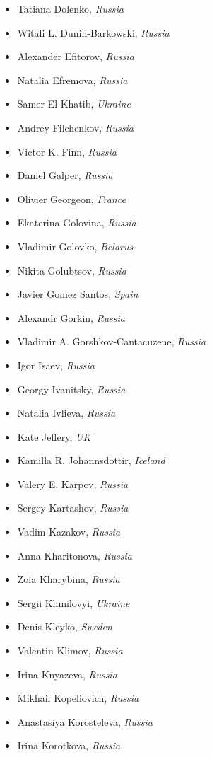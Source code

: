 \documentclass[10pt,fleqn,openany]{book} %
\begin{document}
\begin{multicols}{2}
\begin{itemize}
			\item Tatiana Dolenko, \textit{Russia}
			\item Witali L. Dunin-Barkowski, \textit{Russia}
			\item Alexander Efitorov, \textit{Russia}
			\item Natalia Efremova, \textit{Russia}
			\item Samer El-Khatib, \textit{Ukraine}
			\item Andrey Filchenkov, \textit{Russia}
			\item Victor K. Finn, \textit{Russia}
			\item Daniel Galper, \textit{Russia}
			\item Olivier Georgeon, \textit{France}
			\item Ekaterina Golovina, \textit{Russia}
			\item Vladimir Golovko, \textit{Belarus}
			\item Nikita Golubtsov, \textit{Russia}
			\item Javier Gomez Santos, \textit{Spain}
			\item Alexandr Gorkin, \textit{Russia}
			\item Vladimir A. Gorshkov-Cantacuzene, \textit{Russia}
			\item Igor Isaev, \textit{Russia}
			\item Georgy Ivanitsky, \textit{Russia}
			\item Natalia Ivlieva, \textit{Russia}
			\item Kate Jeffery, \textit{UK}
			\item Kamilla R. Johannsdottir, \textit{Iceland}
			\item Valery E.  Karpov, \textit{Russia}
			\item Sergey Kartashov, \textit{Russia}
			\item Vadim Kazakov, \textit{Russia}
			\item Anna Kharitonova, \textit{Russia}
			\item Zoia Kharybina, \textit{Russia}
			\item Sergii Khmilovyi, \textit{Ukraine}
			\item Denis Kleyko, \textit{Sweden}
			\item Valentin Klimov, \textit{Russia}
			\item Irina Knyazeva, \textit{Russia}
			\item Mikhail Kopeliovich, \textit{Russia}
			\item Anastasiya Korosteleva, \textit{Russia}
			\item Irina Korotkova, \textit{Russia}

\end{itemize}
\end{multicols}
\end{document}
